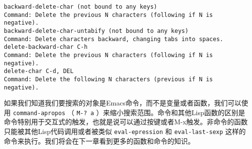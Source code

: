 \begin{verbatim}
backward-delete-char (not bound to any keys) 
Command: Delete the previous N characters (following if N is negative). 
backward-delete-char-untabify (not bound to any keys) 
Command: Delete characters backward, changing tabs into spaces. 
delete-backward-char C-h 
Command: Delete the previous N characters (following if N is negative). 
delete-char C-d, DEL 
Command: Delete the following N characters (previous if N is negative). 
\end{verbatim}

如果我们知道我们要搜索的对象是Emacs命令，而不是变量或者函数，我们可以使用 \texttt{command-apropos} （ \verb|M-? a| ）来缩小搜索范围。命令和其他Lisp函数的区别是命令特别用于交互式的触发，也就是说可以通过按键或者M-x触发。非命令的函数只能被其他Lisp代码调用或者被类似 \texttt{eval-epression} 和 \texttt{eval-last-sexp} 这样的命令来执行。我们将会在下一章看到更多的函数和命令的知识。
